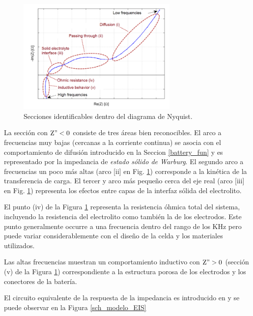 \documentclass[10pt,a4paper]{article}
\begin{document}
\begin{figure}[h!]
    \begin{center}
	\includegraphics[width=0.7\textwidth]{EIS_nyquist_section.png}
	\caption{Secciones identificables dentro del diagrama de Nyquist.}
	\label{EIS_nyquist_sections}
    \end{center}
\end{figure}

\noindent La secci\'on con $\mathrm{Z" < 0}$ consiste de tres \'areas bien 
reconocibles. El arco a frecuencias muy bajas (cercanas a la corriente continua) 
se asocia con el comportamiento de difusi\'on introducido en la Seccion 
\ref{battery_fun} y es representado por la impedancia de \emph{estado s\'olido 
de Warburg}. El segundo arco a frecuencias un poco m\'as altas (arco [ii] en Fig. 
\ref{EIS_nyquist_sections}) corresponde a la kin\'etica de la transferencia de 
carga. El tercer y arco m\'as pequeño cerca del eje real (arco [iii] en Fig. 
\ref{EIS_nyquist_sections}) representa los efectos entre capas de la interfaz 
s\'olida del electrolito.

\noindent El punto (iv) de la Figura \ref{EIS_nyquist_sections} representa la 
resistencia \'ohmica total del sistema, incluyendo la resistencia del 
electrolito como tambi\'en la de los electrodos. Este punto generalmente occurre 
a una frecuencia dentro del rango de los KHz pero puede variar considerablemente 
con el diseño de la celda y los materiales utilizados.

\noindent Las altas frecuencias muestran un comportamiento inductivo con 
$\mathrm{Z" > 0}$ (secci\'on (v) de la Figura \ref{EIS_nyquist_sections}) 
correspondiente a la estructura porosa de los electrodos y los conectores de la 
bater\'ia.

\noindent El circuito equivalente de la respuesta de la impedancia es
introducido en \cite{Moss} y se puede observar en la Figura
\ref{sch_modelo_EIS}
\end{document}
